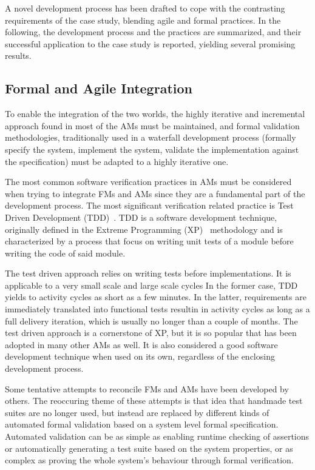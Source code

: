 \documentclass[english]{lni}
\begin{document}
A novel development process has been drafted to cope with the contrasting requirements of the case study, blending agile and formal practices.  
In the following, the development process and the practices are summarized, and their successful application to the case study is reported, yielding several promising results.



\subsection{Formal and Agile Integration}
\label{subsec:formal_and_agile_integration}

To enable the integration of the two worlds, the highly iterative and incremental approach found in most of the AMs must be maintained, and formal validation methodologies, traditionally used in a waterfall development process (formally specify the system, implement the system, validate the implementation against the specification) must be adapted to a highly iterative one.

The most common software verification practices in AMs must be considered when trying to integrate FMs and AMs since they are a fundamental part of the development process. 
The most significant verification related practice is Test Driven Development (TDD)~\cite{Beck2003}. 
TDD is a software development technique, originally defined in the Extreme Programming (XP)~\cite{Beck2004} methodology and is characterized by a process that focus on writing unit tests of a module before writing the code of said module.

The test driven approach relies on writing tests before implementations. 
It is applicable to a very small scale and large scale cycles
In the former case, TDD yields to activity cycles as short as a few minutes.
In the latter, requirements are immediately translated into functional tests resultin in activity cycles as long as a full delivery iteration, which is usually no longer than a couple of months.
The test driven approach is a cornerstone of XP, but it is so popular that has been adopted in many other AMs as well.
It is also considered a good software development technique when used on its own, regardless of the enclosing development process.

Some tentative attempts to reconcile FMs and AMs have been developed by others.
The reoccuring theme of these attempts is that idea that handmade test suites are no longer used, but instead are replaced by different kinds of automated formal validation based on a system level formal specification. 
Automated validation can be as simple as enabling runtime checking of assertions or automatically generating a test suite based on the system properties, or as complex as proving the whole system's behaviour through formal verification.
\end{document}
